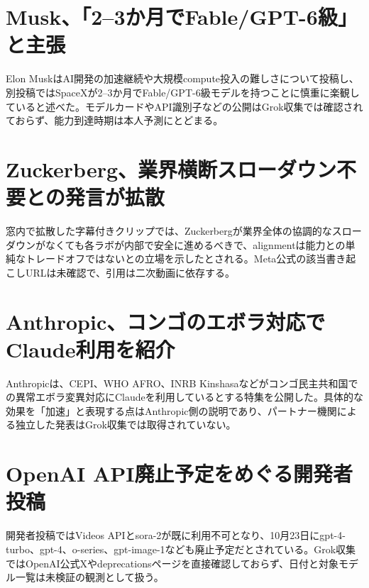 \section{Musk、「2--3か月でFable/GPT-6級」と主張}
Elon MuskはAI開発の加速継続や大規模compute投入の難しさについて投稿し、別投稿ではSpaceXが2--3か月でFable/GPT-6級モデルを持つことに慎重に楽観していると述べた。モデルカードやAPI識別子などの公開はGrok収集では確認されておらず、能力到達時期は本人予測にとどまる。

\section{Zuckerberg、業界横断スローダウン不要との発言が拡散}
窓内で拡散した字幕付きクリップでは、Zuckerbergが業界全体の協調的なスローダウンがなくても各ラボが内部で安全に進めるべきで、alignmentは能力との単純なトレードオフではないとの立場を示したとされる。Meta公式の該当書き起こしURLは未確認で、引用は二次動画に依存する。

\section{Anthropic、コンゴのエボラ対応でClaude利用を紹介}
Anthropicは、CEPI、WHO AFRO、INRB Kinshasaなどがコンゴ民主共和国での異常エボラ変異対応にClaudeを利用しているとする特集を公開した。具体的な効果を「加速」と表現する点はAnthropic側の説明であり、パートナー機関による独立した発表はGrok収集では取得されていない。

\section{OpenAI API廃止予定をめぐる開発者投稿}
開発者投稿ではVideos APIとsora-2が既に利用不可となり、10月23日にgpt-4-turbo、gpt-4、o-series、gpt-image-1なども廃止予定だとされている。Grok収集ではOpenAI公式Xやdeprecationsページを直接確認しておらず、日付と対象モデル一覧は未検証の観測として扱う。


